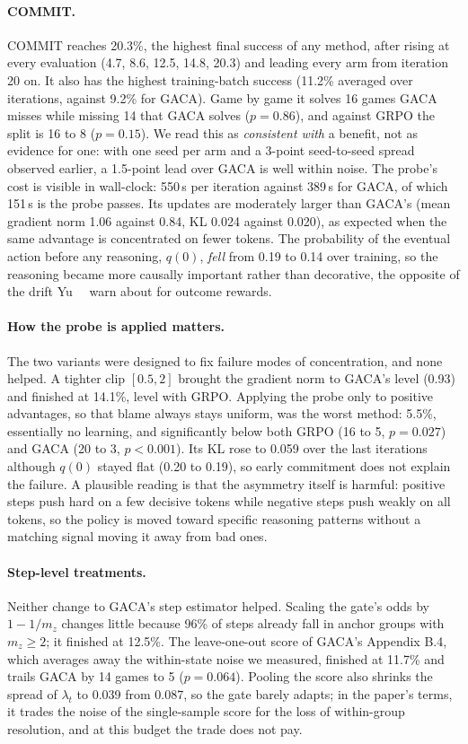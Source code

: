 \paragraph{COMMIT.}
COMMIT reaches 20.3\%, the highest final success of any method, after rising at every evaluation
(4.7, 8.6, 12.5, 14.8, 20.3) and leading every arm from iteration 20 on. It also has the highest
training-batch success (11.2\% averaged over iterations, against 9.2\% for GACA). Game by game it solves
16 games GACA misses while missing 14 that GACA solves ($p = 0.86$), and against GRPO the split is 16 to
8 ($p = 0.15$). We read this as \emph{consistent with} a benefit, not as evidence for one: with one seed
per arm and a 3-point seed-to-seed spread observed earlier, a 1.5-point lead over GACA is well within
noise. The probe's cost is visible in wall-clock: 550\,s per iteration against 389\,s for GACA, of which
151\,s is the probe passes. Its updates are moderately larger than GACA's (mean gradient norm 1.06
against 0.84, KL 0.024 against 0.020), as expected when the same advantage is concentrated on fewer
tokens. The probability of the eventual action before any reasoning, $q(0)$, \emph{fell} from 0.19 to
0.14 over training, so the reasoning became more causally important rather than decorative, the
opposite of the drift Yu~\etal~\cite{yu2026cir} warn about for outcome rewards.

\paragraph{How the probe is applied matters.}
The two variants were designed to fix failure modes of concentration, and none helped.
A tighter clip $[0.5, 2]$ brought the gradient norm to GACA's level (0.93) and finished at 14.1\%, level
with GRPO. Applying the probe only to positive advantages, so that blame always stays uniform, was the
worst method: 5.5\%, essentially no learning, and significantly below both GRPO (16 to 5, $p = 0.027$)
and GACA (20 to 3, $p < 0.001$). Its KL rose to 0.059 over the last iterations although $q(0)$ stayed flat
(0.20 to 0.19), so early commitment does not explain the failure. A plausible reading is that the
asymmetry itself is harmful: positive steps push hard on a few decisive tokens while negative steps push
weakly on all tokens, so the policy is moved toward specific reasoning patterns without a matching
signal moving it away from bad ones.

\paragraph{Step-level treatments.}
Neither change to GACA's step estimator helped. Scaling the gate's odds by $1 - 1/m_z$ changes little
because 96\% of steps already fall in anchor groups with $m_z \geq 2$; it finished at 12.5\%. The
leave-one-out score of GACA's Appendix B.4, which averages away the within-state noise we measured,
finished at 11.7\% and trails GACA by 14 games to 5 ($p = 0.064$). Pooling the score also shrinks the
spread of $\lambda_t$ to 0.039 from 0.087, so the gate barely adapts; in the paper's terms, it trades the
noise of the single-sample score for the loss of within-group resolution, and at this budget the trade
does not pay.

